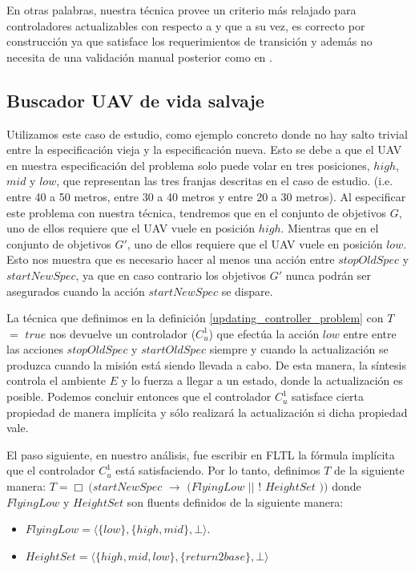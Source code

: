 En otras palabras, nuestra técnica provee un criterio más relajado para controladores actualizables con respecto a
\cite{6224401} y que a su vez, es correcto por construcción ya que satisface los requerimientos de transición y además
no necesita de una validación manual posterior como en \cite{PanzicaLaManna:2013:FCC:2487336.2487349}.

\subsection{Buscador UAV de vida salvaje}

Utilizamos este caso de estudio, como ejemplo concreto donde no hay salto trivial entre la especificación vieja y la
especificación nueva. Esto se debe a que el UAV en nuestra especificación del problema solo puede volar en tres
posiciones, $high$, $mid$ y $low$, que representan las tres franjas descritas en el caso de estudio. (i.e. entre 40 a 50
metros, entre 30 a 40 metros y entre 20 a 30 metros). Al especificar este problema con nuestra técnica, tendremos que en el
conjunto de objetivos $G$, uno de ellos requiere que el UAV vuele en posición $high$. Mientras que en el conjunto de
objetivos $G'$, uno de ellos requiere que el UAV vuele en posición $low$. Esto nos muestra que es necesario hacer
al menos una acción entre $stopOldSpec$ y $startNewSpec$, ya que en caso contrario los objetivos $G'$ nunca podrán ser
asegurados cuando la acción $startNewSpec$ se dispare.

La técnica que definimos en la definición \ref{updating_controller_problem} con $T$ $=$ $true$ nos devuelve un controlador
($C_u^{1}$) que efectúa la acción $low$ entre entre las acciones $stopOldSpec$ y $startOldSpec$ siempre y cuando la
actualización se produzca cuando la misión está siendo llevada a cabo. De esta manera, la síntesis controla el ambiente
$E$ y lo fuerza a llegar a un estado, donde la actualización es posible. Podemos concluir entonces que el controlador
$C_u^1$ satisface cierta propiedad de manera implícita y sólo realizará la actualización si dicha propiedad vale.

El paso siguiente, en nuestro análisis, fue escribir en FLTL la fórmula implícita que el controlador $C_u^1$ está
satisfaciendo. Por lo tanto, definimos $T$ de la siguiente manera: $T = \Box\ (startNewSpec$
$\rightarrow$ $(FlyingLow$ $||$ $!$ $HeightSet$ $))$ donde $FlyingLow$ y $HeightSet$ son fluents definidos de la siguiente manera: 

\begin{itemize}
\itemsep-4mm
\item $FlyingLow = \langle \{low\},\{high,mid\},\bot\rangle$.
\item $HeightSet = \langle \{high,mid,low\},\{return2base\},\bot\rangle$
\end{itemize}

